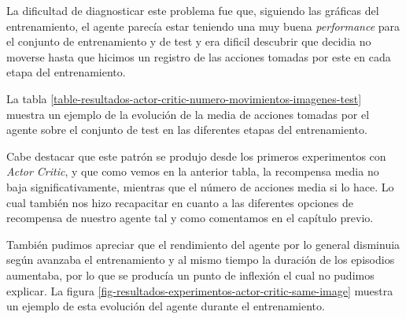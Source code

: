 La dificultad de diagnosticar este problema fue que, siguiendo las gráficas del entrenamiento, el agente parecía estar teniendo una muy buena \textit{performance} para el conjunto de entrenamiento y de test y era dificil descubrir que decidia no moverse hasta que hicimos un registro de las acciones tomadas por este en cada etapa del entrenamiento.
\medskip



La tabla \ref{table-resultados-actor-critic-numero-movimientos-imagenes-test} muestra un ejemplo de la evolución de la media de acciones tomadas por el agente sobre el conjunto de test en las diferentes etapas del entrenamiento.
\medskip

Cabe destacar que este patrón se produjo desde los primeros experimentos con \textit{Actor Critic}, y que como vemos en la anterior tabla, la recompensa media no baja significativamente, mientras que el número de acciones media si lo hace. Lo cual también nos hizo recapacitar en cuanto a las diferentes opciones de recompensa de nuestro agente tal y como comentamos en el capítulo previo.
\medskip

También pudimos apreciar que el rendimiento del agente por lo general disminuia según avanzaba el entrenamiento y al mismo tiempo la duración de los episodios aumentaba, por lo que se producía un punto de inflexión el cual no pudimos explicar. La figura \ref{fig-resultados-experimentos-actor-critic-same-image} muestra un ejemplo de esta evolución del agente durante el entrenamiento.
\medskip

